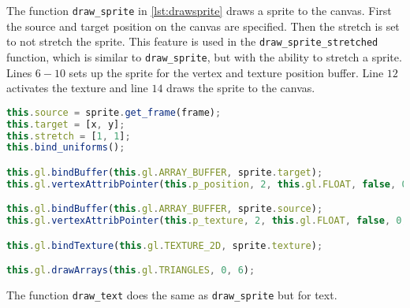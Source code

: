 The function \texttt{draw\_sprite} in \autoref{lst:drawsprite} draws a sprite to the canvas.
First the source and target position on the canvas are specified.
Then the stretch is set to not stretch the sprite.
This feature is used in the \texttt{draw\_sprite\_stretched} function, which is similar to \texttt{draw\_sprite}, but with the ability to stretch a sprite.
Lines $6-10$ sets up the sprite for the vertex and texture position buffer.
Line $12$ activates the texture and line $14$ draws the sprite to the canvas.

\begin{lstlisting}[language=JavaScript, caption=The function \texttt{draw\_sprite}, label=lst:drawsprite]
this.source = sprite.get_frame(frame);
this.target = [x, y];
this.stretch = [1, 1];
this.bind_uniforms();

this.gl.bindBuffer(this.gl.ARRAY_BUFFER, sprite.target);
this.gl.vertexAttribPointer(this.p_position, 2, this.gl.FLOAT, false, 0, 0);

this.gl.bindBuffer(this.gl.ARRAY_BUFFER, sprite.source);
this.gl.vertexAttribPointer(this.p_texture, 2, this.gl.FLOAT, false, 0, 0);

this.gl.bindTexture(this.gl.TEXTURE_2D, sprite.texture);

this.gl.drawArrays(this.gl.TRIANGLES, 0, 6);
\end{lstlisting}

The function \texttt{draw\_text} does the same as \texttt{draw\_sprite} but for text.
